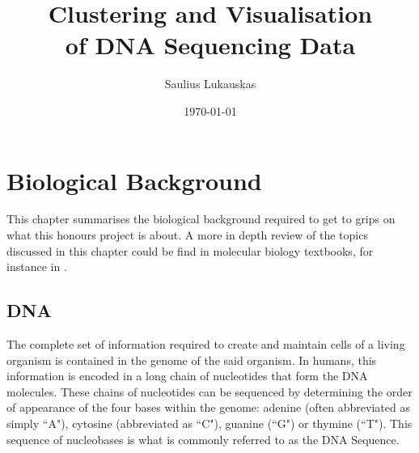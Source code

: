 \documentclass[parskip]{cs4rep}
\begin{document}
\title{Clustering and Visualisation\\ of DNA Sequencing Data}

\author{Saulius Lukauskas}


\date{\today}


\maketitle


\tableofcontents



\chapter{Biological Background}
This chapter summarises the biological background required to get to grips on what this honours project is about. 
A more in depth review of the topics discussed in this chapter could be find in molecular biology textbooks, for instance in \cite{Alberts:2002te}.

\section{DNA}

The complete set of information required to create and maintain cells of a
living organism is contained in the genome of the said organism. In humans, this
information is encoded in a long chain of nucleotides that form the DNA molecules. 
These chains of nucleotides can be sequenced by determining the order of appearance
of the four bases within the genome: adenine (often abbreviated as simply ``A"), cytosine (abbreviated as ``C"),
guanine (``G") or thymine (``T").
This sequence of nucleobases is what is commonly referred to as the DNA Sequence. 
\end{document}
